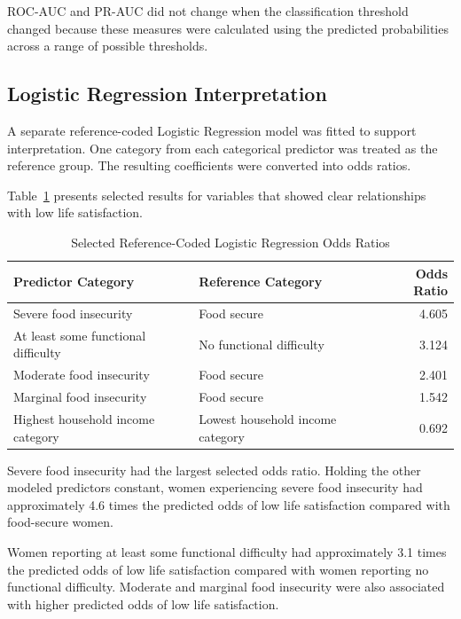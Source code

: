 \documentclass[12pt]{article}
\begin{document}
ROC-AUC and PR-AUC did not change when the classification threshold changed because these measures were calculated using the predicted probabilities across a range of possible thresholds.

\subsection{Logistic Regression Interpretation}

A separate reference-coded Logistic Regression model was fitted to support interpretation. One category from each categorical predictor was treated as the reference group. The resulting coefficients were converted into odds ratios.

Table~\ref{tab:selected_odds_ratios} presents selected results for variables that showed clear relationships with low life satisfaction.

\begin{table}[H]
\centering
\caption{Selected Reference-Coded Logistic Regression Odds Ratios}
\label{tab:selected_odds_ratios}
\begin{tabular}{p{5.2cm}p{5.1cm}r}
\hline
\textbf{Predictor Category} &
\textbf{Reference Category} &
\textbf{Odds Ratio} \\
\hline
Severe food insecurity &
Food secure &
4.605 \\

At least some functional difficulty &
No functional difficulty &
3.124 \\

Moderate food insecurity &
Food secure &
2.401 \\

Marginal food insecurity &
Food secure &
1.542 \\

Highest household income category &
Lowest household income category &
0.692 \\
\hline
\end{tabular}
\end{table}

Severe food insecurity had the largest selected odds ratio. Holding the other modeled predictors constant, women experiencing severe food insecurity had approximately 4.6 times the predicted odds of low life satisfaction compared with food-secure women.

Women reporting at least some functional difficulty had approximately 3.1 times the predicted odds of low life satisfaction compared with women reporting no functional difficulty. Moderate and marginal food insecurity were also associated with higher predicted odds of low life satisfaction.
\end{document}
